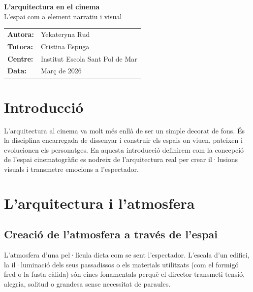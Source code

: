 \documentclass[11pt, a4paper]{report}
\begin{document}
\begin{titlepage}
    \centering
    \vspace*{2cm}
    {\huge \textbf{L'arquitectura en el cinema}}\\[0.5cm]
    {\Large L'espai com a element narratiu i visual}\\[2cm]

\begin{center}
    \centering
    \vspace{4cm} %
\end{center}
    
    \vfill
    
    \begin{tabular}{ll}
        \textbf{Autora:} & Yekateryna Rud \\
        \textbf{Tutora:} & Cristina Espuga \\
        \textbf{Centre:} & Institut Escola Sant Pol de Mar \\
        \textbf{Data:} & Març de 2026
    \end{tabular}
\end{titlepage}

\tableofcontents


\chapter{Introducció}
L'arquitectura al cinema va molt més enllà de ser un simple decorat de fons. És la disciplina encarregada de dissenyar i construir els espais on viuen, pateixen i evolucionen els personatges. En aquesta introducció definirem com la concepció de l'espai cinematogràfic es nodreix de l'arquitectura real per crear il·lusions visuals i transmetre emocions a l'espectador.

\chapter{L'arquitectura i l'atmosfera}

\section{Creació de l'atmosfera a través de l'espai}
L'atmosfera d'una pel·lícula dicta com se sent l'espectador. L'escala d'un edifici, la il·luminació dels seus passadissos o els materials utilitzats (com el formigó fred o la fusta càlida) són eines fonamentals perquè el director transmeti tensió, alegria, solitud o grandesa sense necessitat de paraules.
\end{document}
